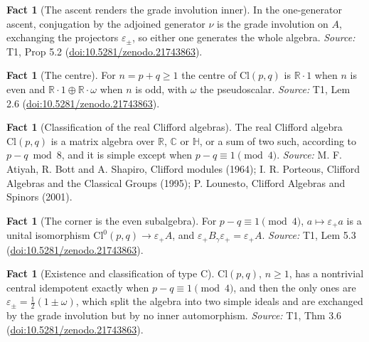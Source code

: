 \documentclass[11pt]{article}
\theoremstyle{definition}
\newtheorem{fact}[theorem]{Fact}
\theoremstyle{plain}
\providecommand{\C}{}\renewcommand{\C}{\mathbb{C}}
\providecommand{\Cl}{}\renewcommand{\Cl}{\mathrm{Cl}}
\providecommand{\HH}{}\renewcommand{\HH}{\mathbb{H}}
\providecommand{\R}{}\renewcommand{\R}{\mathbb{R}}
\begin{document}
\begin{fact}[The ascent renders the grade involution inner]\label{c:transport.ascent-renders-grade-involution-inner}
In the one-generator ascent, conjugation by the adjoined generator $\nu$ is the grade involution on $A$, exchanging the projectors $\varepsilon_\pm$, so either one generates the whole algebra.
\emph{Source:} T1, Prop 5.2 (\href{https://doi.org/10.5281/zenodo.21743863}{doi:10.5281/zenodo.21743863}).
\end{fact}

\begin{fact}[The centre]\label{c:transport.centre}
For $n = p + q \geq 1$ the centre of $\Cl(p,q)$ is $\R \cdot 1$ when $n$ is even and $\R \cdot 1 \oplus \R \cdot \omega$ when $n$ is odd, with $\omega$ the pseudoscalar.
\emph{Source:} T1, Lem 2.6 (\href{https://doi.org/10.5281/zenodo.21743863}{doi:10.5281/zenodo.21743863}).
\end{fact}

\begin{fact}[Classification of the real Clifford algebras]\label{c:transport.classification-real-clifford-algebras}
The real Clifford algebra $\Cl(p,q)$ is a matrix algebra over $\R$, $\C$ or $\HH$, or a sum of two such, according to $p - q \bmod 8$, and it is simple except when $p - q \equiv 1 \pmod 4$.
\emph{Source:} M. F. Atiyah, R. Bott and A. Shapiro, Clifford modules (1964); I. R. Porteous, Clifford Algebras and the Classical Groups (1995); P. Lounesto, Clifford Algebras and Spinors (2001).
\end{fact}

\begin{fact}[The corner is the even subalgebra]\label{c:transport.corner-even-subalgebra}
For $p - q \equiv 1 \pmod 4$, $a \mapsto \varepsilon_+ a$ is a unital isomorphism $\Cl^{0}(p,q) \to \varepsilon_+ A$, and $\varepsilon_+ B_\gamma \varepsilon_+ = \varepsilon_+ A$.
\emph{Source:} T1, Lem 5.3 (\href{https://doi.org/10.5281/zenodo.21743863}{doi:10.5281/zenodo.21743863}).
\end{fact}

\begin{fact}[Existence and classification of type C]\label{c:transport.existence-classification-type-c}
$\Cl(p,q)$, $n \geq 1$, has a nontrivial central idempotent exactly when $p - q \equiv 1 \pmod 4$, and then the only ones are $\varepsilon_\pm = \tfrac12(1 \pm \omega)$, which split the algebra into two simple ideals and are exchanged by the grade involution but by no inner automorphism.
\emph{Source:} T1, Thm 3.6 (\href{https://doi.org/10.5281/zenodo.21743863}{doi:10.5281/zenodo.21743863}).
\end{fact}
\end{document}
